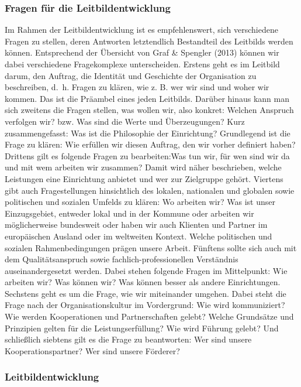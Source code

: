 \documentclass[
  letterpaper,
]{book}
\begin{document}
\subsubsection{Fragen für die
Leitbildentwicklung}\label{fragen-fuxfcr-die-leitbildentwicklung}

Im Rahmen der Leitbildentwicklung ist es empfehlenswert, sich
verschiedene Fragen zu stellen, deren Antworten letztendlich Bestandteil
des Leitbilds werden können. Entsprechend der Übersicht von Graf \&
Spengler (2013) können wir dabei verschiedene Fragekomplexe
unterscheiden. Erstens geht es im Leitbild darum, den Auftrag, die
Identität und Geschichte der Organisation zu beschreiben, d.~h. Fragen
zu klären, wie z. B. wer wir sind und woher wir kommen. Das ist die
Präambel eines jeden Leitbilds. Darüber hinaus kann man sich zweitens
die Fragen stellen, was wollen wir, also konkret: Welchen Anspruch
verfolgen wir? bzw. Was sind die Werte und Überzeugungen? Kurz
zusammengefasst: Was ist die Philosophie der Einrichtung? Grundlegend
ist die Frage zu klären: Wie erfüllen wir diesen Auftrag, den wir vorher
definiert haben? Drittens gilt es folgende Fragen zu bearbeiten:Was tun
wir, für wen sind wir da und mit wem arbeiten wir zusammen? Damit wird
näher beschrieben, welche Leistungen eine Einrichtung anbietet und wer
zur Zielgruppe gehört. Viertens gibt auch Fragestellungen hinsichtlich
des lokalen, nationalen und globalen sowie politischen und sozialen
Umfelds zu klären: Wo arbeiten wir? Was ist unser Einzugsgebiet,
entweder lokal und in der Kommune oder arbeiten wir möglicherweise
bundesweit oder haben wir auch Klienten und Partner im europäischen
Ausland oder im weltweiten Kontext. Welche politischen und sozialen
Rahmenbedingungen prägen unsere Arbeit. Fünftens sollte sich auch mit
dem Qualitätsanspruch sowie fachlich-professionellen Verständnis
auseinandergesetzt werden. Dabei stehen folgende Fragen im Mittelpunkt:
Wie arbeiten wir? Was können wir? Was können besser als andere
Einrichtungen. Sechstens geht es um die Frage, wie wir miteinander
umgehen. Dabei steht die Frage nach der Organisationskultur im
Vordergrund: Wie wird kommuniziert? Wie werden Kooperationen und
Partnerschaften gelebt? Welche Grundsätze und Prinzipien gelten für die
Leistungserfüllung? Wie wird Führung gelebt? Und schließlich siebtens
gilt es die Frage zu beantworten: Wer sind unsere Kooperationspartner?
Wer sind unsere Förderer?

\subsubsection{Leitbildentwicklung}\label{leitbildentwicklung}
\end{document}
